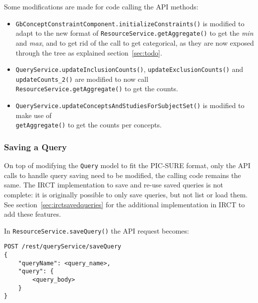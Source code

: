 Some modifications are made for code calling the API methods:
\begin{itemize}
    \item \verb|GbConceptConstraintComponent.initializeConstraints()| is modified to adapt to the new format of \verb|ResourceService.getAggregate()| to get the \emph{min} and \emph{max}, and to get rid of the call to get categorical, as they are now exposed through the tree as explained section~\ref{sec:todo}.

    \item \verb|QueryService.updateInclusionCounts()|, \verb|updateExclusionCounts()| and \verb|updateCounts_2()| are modified to now call \verb|ResourceService.getAggregate()| to get the counts.

    \item \verb|QueryService.updateConceptsAndStudiesForSubjectSet()| is modified to make use of \\
    \verb|getAggregate()| to get the counts per concepts.
\end{itemize}





\subsubsection{Saving a Query}
On top of modifying the \verb|Query| model to fit the PIC-SURE format, only the API calls to handle query saving need to be modified, the calling code remains the same.
The IRCT implementation to save and re-use saved queries is not complete: it is originally possible to only save queries, but not list or load them. 
See section~\ref{sec:irctsavedqueries} for the additional implementation in IRCT to add these features.

In \verb|ResourceService.saveQuery()| the API request becomes:
\begin{verbatim}
POST /rest/queryService/saveQuery
{
    "queryName": <query_name>,
    "query": {
        <query_body>
    }
}    
\end{verbatim}

